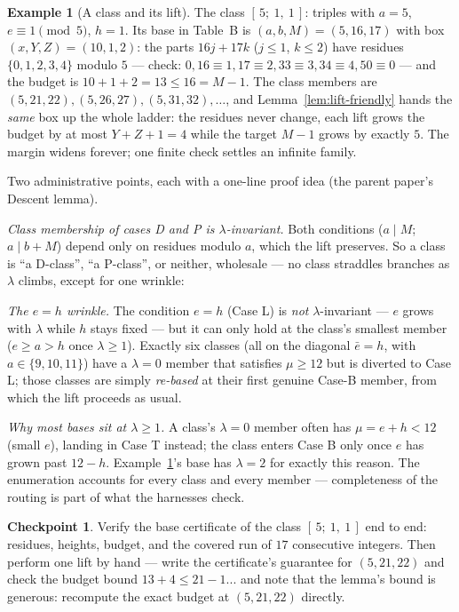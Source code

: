 \documentclass[11pt,reqno]{amsart}
\theoremstyle{plain}
\theoremstyle{definition}
\newtheorem{example}[theorem]{Example}
\newtheorem{checkpoint}[theorem]{Checkpoint}   %
\theoremstyle{remark}
\begin{document}
\begin{example}[A class and its lift]\label{ex:caseB-friendly}
The class $[\,5;\ 1,\ 1\,]$: triples with $a = 5$, $e \equiv 1 \pmod 5$, $h = 1$.
Its base in Table~B is $(a, b, M) = (5, 16, 17)$ with box $(x, Y, Z) = (10, 1,
2)$: the parts $16j + 17k$ ($j \le 1$, $k \le 2$) have residues $\{0, 1, 2, 3,
4\}$ modulo $5$ --- check: $0, 16 \equiv 1, 17 \equiv 2, 33 \equiv 3, 34 \equiv
4, 50 \equiv 0$ --- and the budget is $10 + 1 + 2 = 13 \le 16 = M - 1$. The
class members are $(5, 21, 22), (5, 26, 27), (5, 31, 32), \dots$, and
Lemma~\ref{lem:lift-friendly} hands the \emph{same} box up the whole ladder: the
residues never change, each lift grows the budget by at most $Y + Z + 1 = 4$
while the target $M - 1$ grows by exactly $5$. The margin widens forever; one
finite check settles an infinite family.
\end{example}

Two administrative points, each with a one-line proof idea (the parent paper's
Descent lemma).

\emph{Class membership of cases D and P is $\lambda$-invariant.} Both conditions
($a \mid M$; $a \mid b + M$) depend only on residues modulo $a$, which the lift
preserves. So a class is ``a D-class'', ``a P-class'', or neither, wholesale ---
no class straddles branches as $\lambda$ climbs, except for one wrinkle:

\emph{The $e = h$ wrinkle.} The condition $e = h$ (Case L) is \emph{not}
$\lambda$-invariant --- $e$ grows with $\lambda$ while $h$ stays fixed --- but it
can only hold at the class's smallest member ($e \ge a > h$ once $\lambda \ge
1$). Exactly six classes (all on the diagonal $\bar e = h$, with $a \in \{9, 10,
11\}$) have a $\lambda = 0$ member that satisfies $\mu \ge 12$ but is diverted
to Case L; those classes are simply \emph{re-based} at their first genuine
Case-B member, from which the lift proceeds as usual.

\emph{Why most bases sit at $\lambda \ge 1$.} A class's $\lambda = 0$ member
often has $\mu = e + h < 12$ (small $e$), landing in Case T instead; the class
enters Case B only once $e$ has grown past $12 - h$. Example~\ref{ex:caseB-friendly}'s
base has $\lambda = 2$ for exactly this reason. The enumeration accounts for
every class and every member --- completeness of the routing is part of what the
harnesses check.

\begin{checkpoint}
Verify the base certificate of the class $[\,5;\ 1,\ 1\,]$ end to end: residues,
heights, budget, and the covered run of $17$ consecutive integers. Then perform
one lift by hand --- write the certificate's guarantee for $(5, 21, 22)$ and
check the budget bound $13 + 4 \le 21 - 1$... and note that the lemma's bound is
generous: recompute the exact budget at $(5,21,22)$ directly.
\end{checkpoint}
\end{document}
